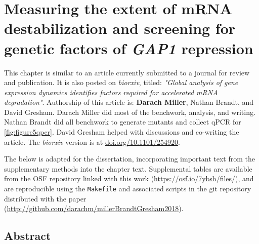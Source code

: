 \chapter{Measuring the extent of mRNA destabilization and screening 
for genetic factors of \textit{GAP1} repression}
\label{chapter:three}

This chapter is similar to an article currently submitted to a 
journal for review and publication. 
It is also posted on \textit{biorxiv}, titled:
\textit{"Global analysis of gene expression dynamics identifies factors
required for accelerated mRNA degradation"}.
Authorship of this article is: \textbf{Darach Miller}, Nathan Brandt, 
and David Gresham.
Darach Miller did most of the benchwork, analysis, and writing.
Nathan Brandt did all benchwork to generate mutants and collect qPCR 
for \autoref{fig:figure5qpcr}.
David Gresham helped with discussions and co-writing the article.
The \textit{biorxiv} version is at \url{doi.org/10.1101/254920}.

The below is adapted for the dissertation, incorporating important
text from the supplementary methods into the chapter text.
Supplemental tables are available from the OSF repository linked 
with this work (\url{https://osf.io/7ybsh/files/}), 
and are reproducible
using the \texttt{Makefile} and associated scripts
in the git repository distributed with the paper
(\url{http://github.com/darachm/millerBrandtGresham2018}).


\section{Abstract}

